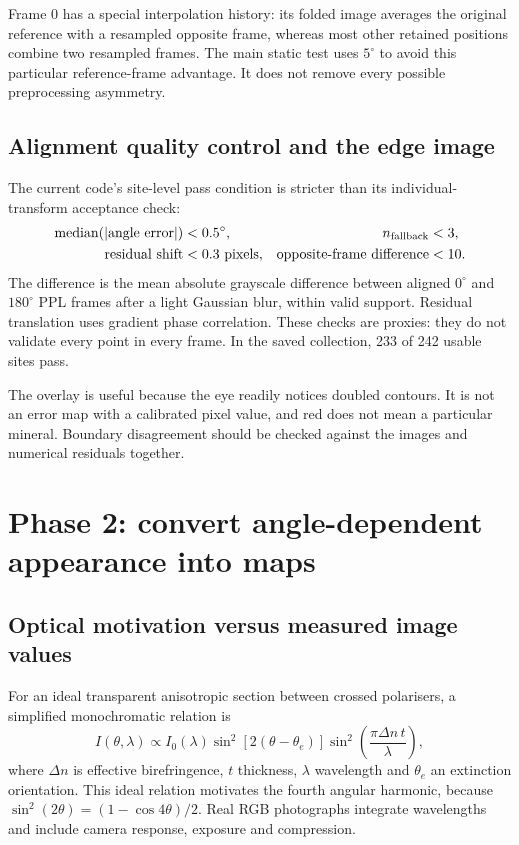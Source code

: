 Frame 0 has a special interpolation history: its folded image averages the original reference with a resampled opposite frame, whereas most other retained positions combine two resampled frames. The main static test uses $5^\circ$ to avoid this particular reference-frame advantage. It does not remove every possible preprocessing asymmetry.

\subsection{Alignment quality control and the edge image}
The current code's site-level pass condition is stricter than its individual-transform acceptance check:
\begin{align}
\operatorname{median}(|\text{angle error}|)&<0.5^\circ, & n_{\rm fallback}&<3,\\
\text{residual shift}&<0.3\text{ pixels}, & \text{opposite-frame difference}&<10.
\end{align}
The difference is the mean absolute grayscale difference between aligned $0^\circ$ and $180^\circ$ PPL frames after a light Gaussian blur, within valid support. Residual translation uses gradient phase correlation. These checks are proxies: they do not validate every point in every frame. In the saved collection, 233 of 242 usable sites pass.

The overlay is useful because the eye readily notices doubled contours. It is not an error map with a calibrated pixel value, and red does not mean a particular mineral. Boundary disagreement should be checked against the images and numerical residuals together.
\FloatBarrier

\section{Phase 2: convert angle-dependent appearance into maps}
\subsection{Optical motivation versus measured image values}
For an ideal transparent anisotropic section between crossed polarisers, a simplified monochromatic relation is
\begin{equation}\label{eq:optics}
I(\theta,\lambda)\propto I_0(\lambda)\sin^2[2(\theta-\theta_e)]
\sin^2\left(\frac{\pi\Delta n\,t}{\lambda}\right),
\end{equation}
where $\Delta n$ is effective birefringence, $t$ thickness, $\lambda$ wavelength and $\theta_e$ an extinction orientation. This ideal relation motivates the fourth angular harmonic, because $\sin^2(2\theta)=(1-\cos4\theta)/2$. Real RGB photographs integrate wavelengths and include camera response, exposure and compression.

